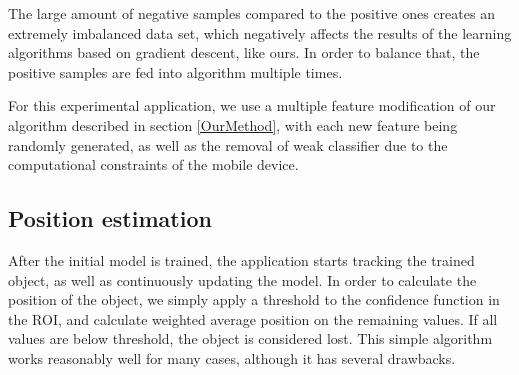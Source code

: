 The large amount of negative samples compared to the positive ones creates an extremely imbalanced data set, which negatively affects the results of the learning algorithms based on gradient descent, like ours. In order to balance that, the positive samples are fed into algorithm multiple times. 

For this experimental application, we use a multiple feature modification of our algorithm described in section \ref{OurMethod}, with each new feature being randomly generated, as well as the removal of weak classifier due to the computational constraints of the mobile device.

\subsection{Position estimation}
After the initial model is trained, the application starts tracking the trained object, as well as continuously updating the model. In order to calculate the position of the object, we simply apply a threshold to the confidence function in the ROI, and calculate weighted average position on the remaining values. If all values are below threshold, the object is considered lost. This simple algorithm works reasonably well for many cases, although it has several drawbacks.
